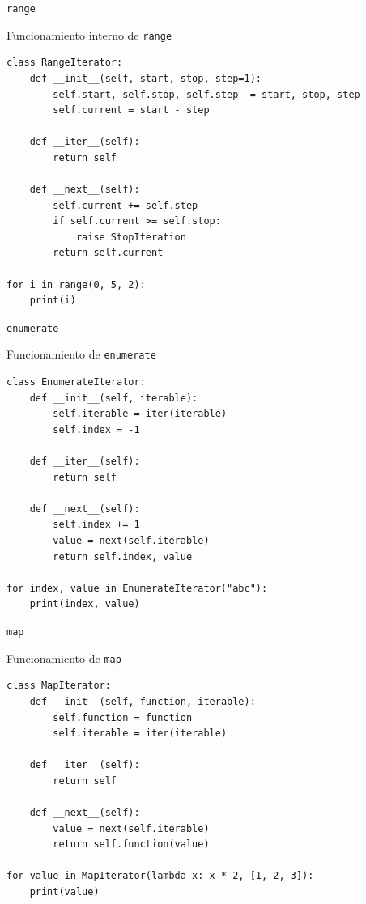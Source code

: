\documentclass[11pt]{beamer}
\begin{document}
\begin{frame}[fragile]{\texttt{range}}
\begin{block}{Funcionamiento interno de \texttt{range}}
\begin{verbatim}
class RangeIterator:
    def __init__(self, start, stop, step=1):
        self.start, self.stop, self.step  = start, stop, step
        self.current = start - step

    def __iter__(self):
        return self

    def __next__(self):
        self.current += self.step
        if self.current >= self.stop:
            raise StopIteration
        return self.current

for i in range(0, 5, 2):
    print(i)
\end{verbatim}
\end{block}  
\end{frame}

\begin{frame}[fragile]{\texttt{enumerate}}
\begin{block}{Funcionamiento de \texttt{enumerate}}
\begin{verbatim}
class EnumerateIterator:
    def __init__(self, iterable):
        self.iterable = iter(iterable)
        self.index = -1

    def __iter__(self):
        return self

    def __next__(self):
        self.index += 1
        value = next(self.iterable)
        return self.index, value

for index, value in EnumerateIterator("abc"):
    print(index, value)
\end{verbatim}
\end{block}  
\end{frame}

\begin{frame}[fragile]{\texttt{map}}
\begin{block}{Funcionamiento de \texttt{map}}
\begin{verbatim}
class MapIterator:
    def __init__(self, function, iterable):
        self.function = function
        self.iterable = iter(iterable)

    def __iter__(self):
        return self

    def __next__(self):
        value = next(self.iterable)
        return self.function(value)

for value in MapIterator(lambda x: x * 2, [1, 2, 3]):
    print(value)
\end{verbatim}
\end{block}  
\end{frame}
\end{document}
